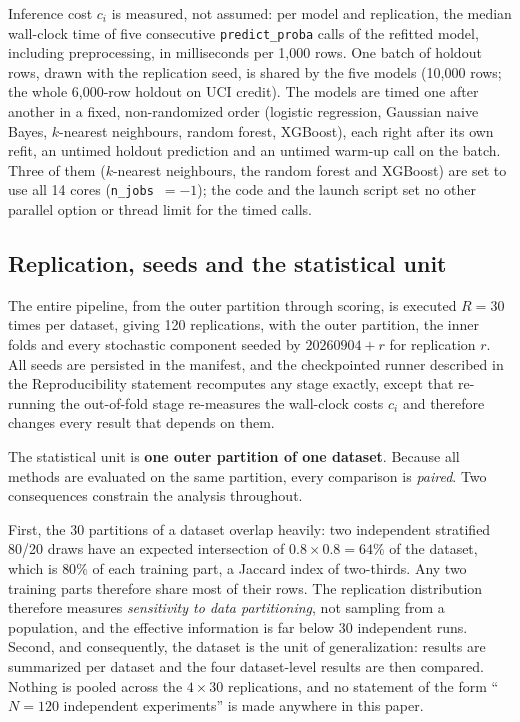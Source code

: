 Inference cost $c_i$ is measured, not assumed: per model and replication, the median wall-clock time of five
consecutive \texttt{predict\_proba} calls of the refitted model, including preprocessing, in milliseconds per
1{,}000 rows. One batch of holdout rows, drawn with the replication seed, is shared by the five models (10{,}000 rows;
the whole 6{,}000-row holdout on UCI credit). The models are timed one after another in a fixed, non-randomized order
(logistic regression, Gaussian naive Bayes, $k$-nearest neighbours, random forest, XGBoost), each right after its own
refit, an untimed holdout prediction and an untimed warm-up call on the batch. Three of them ($k$-nearest neighbours,
the random forest and XGBoost) are set to use all 14 cores (\texttt{n\_jobs}~$=-1$); the code and the launch script
set no other parallel option or thread limit for the timed calls.

\subsection{Replication, seeds and the statistical unit}
\label{sec:protocol:replication}

The entire pipeline, from the outer partition through scoring, is executed $R = 30$ times per dataset, giving 120
replications, with the outer partition, the inner folds and every stochastic component seeded by
$\text{20260904} + r$ for replication $r$. All seeds are persisted in the manifest, and the checkpointed runner
described in the Reproducibility statement recomputes any stage exactly, except that re-running the out-of-fold stage
re-measures the wall-clock costs $c_i$ and therefore changes every result that depends on them.

The statistical unit is \textbf{one outer partition of one dataset}. Because all methods are evaluated on the same
partition, every comparison is \emph{paired}. Two consequences constrain the analysis throughout.

First, the 30 partitions of a dataset overlap heavily: two independent stratified 80/20 draws have an expected
intersection of $0.8 \times 0.8 = 64\%$ of the dataset, which is $80\%$ of each training part, a Jaccard index of
two-thirds. Any two training parts therefore share most of their rows.
The replication distribution therefore measures \emph{sensitivity to data partitioning}, not sampling from a
population, and the effective information is far below 30 independent runs. Second, and consequently, the dataset is
the unit of generalization: results are summarized per dataset and the four dataset-level results are then compared.
Nothing is pooled across the $4 \times 30$ replications, and no statement of the form ``$N = 120$ independent
experiments'' is made anywhere in this paper.

